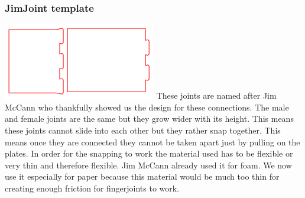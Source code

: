 \documentclass[../ClassicThesis.tex]{subfiles}
\begin{document}
\subsubsection{JimJoint template}
    \includegraphics[width=0.5\columnwidth]{Images/jimjoints.png}
    These joints are named after Jim McCann who thankfully showed us the design for these connections.
    The male and female joints are the same but they grow wider with its height. This means these joints cannot slide into each other but they rather snap together. This means once they are connected they cannot be taken apart just by pulling on the plates. 
    In order for the snapping to work the material used has to be flexible or very thin and therefore flexible. Jim McCann already used it for foam. We now use it especially for paper because this material would be much too thin for creating enough friction for fingerjoints to work.
\end{document}
